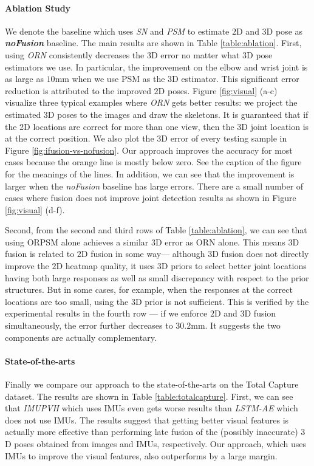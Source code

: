 \documentclass[10pt,twocolumn,letterpaper]{article}
\begin{document}
\paragraph{Ablation Study}
We denote the baseline which uses \emph{SN} and \emph{PSM} to estimate $2$D and $3$D pose as \textbf{\emph{noFusion}} baseline. The main results are shown in Table \ref{table:ablation}. 
First, using \emph{ORN} consistently decreases the $3$D error no matter what $3$D pose estimators we use. In particular, the improvement on the elbow and wrist joint is as large as $10$mm when we use PSM as the $3$D estimator. This significant error reduction is attributed to the improved $2$D poses. 
Figure \ref{fig:visual} (a-c) visualize three typical examples where \emph{ORN} gets better results: we project the estimated $3$D poses to the images and draw the skeletons. It is guaranteed that if the 2D locations are correct for more than one view, then the 3D joint location is at the correct position. We also plot the $3$D error of every testing sample in Figure \ref{fig:ifusion-vs-nofusion}. Our approach improves the accuracy for most cases because the orange line is mostly below zero. See the caption of the figure for the meanings of the lines. In addition, we can see that the improvement is larger when the \emph{noFusion} baseline has large errors. There are a small number of cases where fusion does not improve joint detection results as shown in Figure \ref{fig:visual} (d-f).

Second, from the second and third rows of Table \ref{table:ablation}, we can see that using ORPSM alone achieves a similar $3$D error as ORN alone. This means $3$D fusion is related to $2$D fusion in some way--- although $3$D fusion does not directly improve the $2$D heatmap quality, it uses $3$D priors to select better joint locations having both large responses as well as small discrepancy with respect to the prior structures. But in some cases, for example, when the responses at the correct locations are too small, using the $3$D prior is not sufficient. This is verified by the experimental results in the fourth row --- if we enforce $2$D and $3$D fusion simultaneously, the error further decreases to $30.2$mm. It suggests the two components are actually complementary.



\paragraph{State-of-the-arts } Finally we compare our approach to the state-of-the-arts on the Total Capture dataset. The results are shown in Table \ref{table:totalcapture}. First, we can see that \emph{IMUPVH} \cite{gilbert2019fusing} which uses IMUs even gets worse results than \emph{LSTM-AE} \cite{trumble2018deep} which does not use IMUs. The results suggest that getting better visual features is actually more effective than performing late fusion of the (possibly inaccurate) $3$D poses obtained from images and IMUs, respectively. Our approach, which uses IMUs to improve the visual features, also outperforms \cite{gilbert2019fusing} by a large margin.
\end{document}
